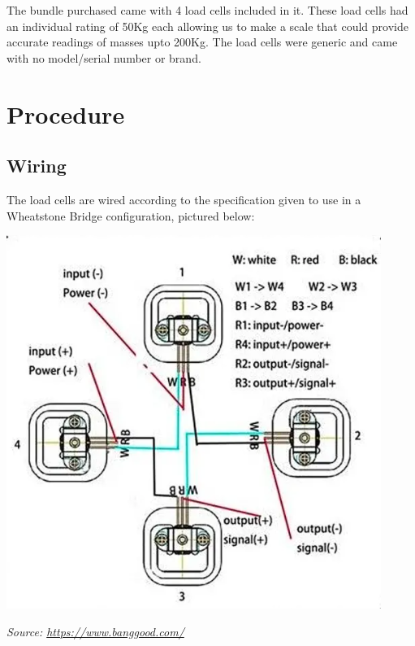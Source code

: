 \documentclass[letterpaper,11pt]{article}
\begin{document}
The bundle purchased came with 4 load cells included in it. These load cells had
an individual rating of 50Kg each allowing us to make a scale that could provide
accurate readings of masses upto 200Kg. The load cells were generic and came
with no model/serial number or brand.

\section{Procedure}
\subsection{Wiring}
The load cells are wired according to the specification given to use in a
Wheatstone Bridge configuration, pictured below:

{\center\includegraphics[scale=.5]{loadcellwiring}\par}
{\textit{Source: \href{https://www.banggood.com/4pcs-DIY-50KG-Body-Load-Cell-Weight-Strain-Sensor-Resistance-With-HX711-AD-Module-p-1326815.html?utm_source=googleshopping&utm_medium=cpc_organic&gmcCountry=US&utm_content=shopping&utm_campaign=us-pc&currency=USD&createTmp=1&utm_source=googleshopping&utm_medium=cpc_bgs&utm_content=frank&utm_campaign=frank-ssc-us-toys-tool-ele-newcustom-ncv80-0116&ad_id=411455834827&gclid=Cj0KCQjwy6T1BRDXARIsAIqCTXpl9vvx29pgQ5I5bO3OfoMXg4CrioA-04iYSjtnyxtn5z5hVLJjgT4aAulwEALw_wcB&cur_warehouse=CN}{https://www.banggood.com/}}}
\end{document}
